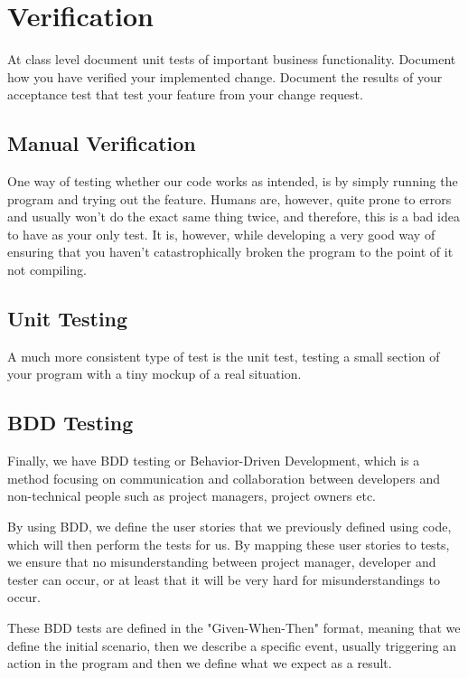 \section{Verification}
At class level document unit tests of important business functionality.
Document how you have verified your implemented change.
Document the results of your acceptance test that test your feature from your change request.


\subsection{Manual Verification}
One way of testing whether our code works as intended, is by simply running the program and trying out the feature. Humans are, however, quite prone to errors and usually won't do the exact same thing twice, and therefore, this is a bad idea to have as your only test. It is, however, while developing a very good way of ensuring that you haven't catastrophically broken the program to the point of it not compiling.
\subsection{Unit Testing}
A much more consistent type of test is the unit test, testing a small section of your program with a tiny mockup of a real situation.

\subsection{BDD Testing}
Finally, we have BDD testing or Behavior-Driven Development, which is a method focusing on communication and collaboration between developers and non-technical people such as project managers, project owners etc.

By using BDD, we define the user stories that we previously defined using code, which will then perform the tests for us. By mapping these user stories to tests, we ensure that no misunderstanding between project manager, developer and tester can occur, or at least that it will be very hard for misunderstandings to occur.

These BDD tests are defined in the "Given-When-Then" format, meaning that we define the initial scenario, then we describe a specific event, usually triggering an action in the program and then we define what we expect as a result.